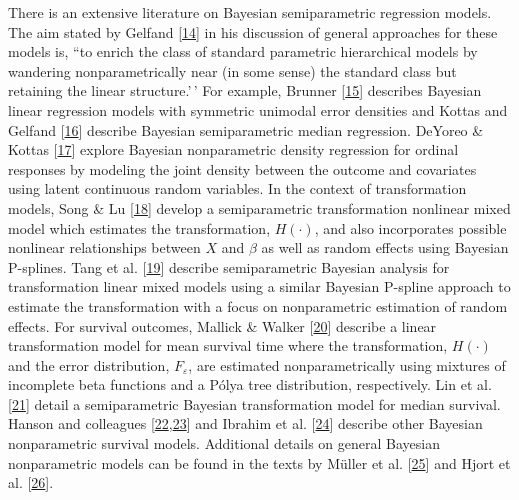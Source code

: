 \documentclass[
]{article}
\begin{document}
There is an extensive literature on Bayesian semiparametric regression models. The aim stated by Gelfand {[}\protect\hyperlink{ref-gelfand_approaches_1999}{14}{]} in his discussion of general approaches for these models is, ``to enrich the class of standard parametric hierarchical models by wandering nonparametrically near (in some sense) the standard class but retaining the linear structure.'\,' For example, Brunner {[}\protect\hyperlink{ref-brunner_bayesian_1995}{15}{]} describes Bayesian linear regression models with symmetric unimodal error densities and Kottas and Gelfand {[}\protect\hyperlink{ref-kottas_bayesian_2001}{16}{]} describe Bayesian semiparametric median regression.
DeYoreo \& Kottas {[}\protect\hyperlink{ref-deyoreo_bayesian_2020}{17}{]} explore Bayesian nonparametric density regression for ordinal responses by modeling the joint density between the outcome and covariates using latent continuous random variables. In the context of transformation models, Song \& Lu {[}\protect\hyperlink{ref-song_semiparametric_2012}{18}{]} develop a semiparametric transformation nonlinear mixed model which estimates the transformation, \(H(\cdot)\), and also incorporates possible nonlinear relationships between \(X\) and \(\beta\) as well as random effects using Bayesian P-splines. Tang et al. {[}\protect\hyperlink{ref-tang_semiparametric_2018}{19}{]} describe semiparametric Bayesian analysis for transformation linear mixed models using a similar Bayesian P-spline approach to estimate the transformation with a focus on nonparametric estimation of random effects. For survival outcomes, Mallick \& Walker {[}\protect\hyperlink{ref-mallick_bayesian_2003}{20}{]} describe a linear transformation model for mean survival time where the transformation, \(H(\cdot)\) and the error distribution, \(F_{\varepsilon}\), are estimated nonparametrically using mixtures of incomplete beta functions and a Pólya tree distribution, respectively. Lin et al. {[}\protect\hyperlink{ref-lin_semiparametric_2012}{21}{]} detail a semiparametric Bayesian transformation model for median survival. Hanson and colleagues {[}\protect\hyperlink{ref-damien_surviving_2013}{22},\protect\hyperlink{ref-hanson_bayesian_2007}{23}{]} and Ibrahim et al. {[}\protect\hyperlink{ref-ibrahim_bayesian_2010}{24}{]} describe other Bayesian nonparametric survival models. Additional details on general Bayesian nonparametric models can be found in the texts by Müller et al. {[}\protect\hyperlink{ref-muller_bayesian_2015}{25}{]} and Hjort et al. {[}\protect\hyperlink{ref-hjort_bayesian_2010}{26}{]}.
\end{document}
